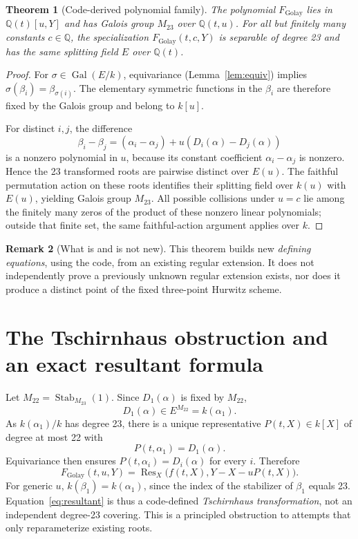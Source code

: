 \documentclass[11pt,letterpaper]{article}
\newtheorem{theorem}{Theorem}[section]
\theoremstyle{definition}
\newtheorem{remark}[theorem]{Remark}
\newcommand{\QQ}{\mathbb{Q}}
\newcommand{\Gal}{\operatorname{Gal}}
\newcommand{\Stab}{\operatorname{Stab}}
\newcommand{\Res}{\operatorname{Res}}
\begin{document}
\begin{theorem}[Code-derived polynomial family]\label{thm:transform}
The polynomial \(F_{\mathrm{Golay}}\) lies in \(\QQ(t)[u,Y]\) and has Galois group \(M_{23}\) over \(\QQ(t,u)\). For all but finitely many constants \(c\in\QQ\), the specialization \(F_{\mathrm{Golay}}(t,c,Y)\) is separable of degree 23 and has the same splitting field \(E\) over \(\QQ(t)\).
\end{theorem}
\begin{proof}
For \(\sigma\in\Gal(E/k)\), equivariance (Lemma~\ref{lem:equiv}) implies \(\sigma(\beta_i)=\beta_{\sigma(i)}\). The elementary symmetric functions in the \(\beta_i\) are therefore fixed by the Galois group and belong to \(k[u]\).

For distinct \(i,j\), the difference
\[
\beta_i-\beta_j=(\alpha_i-\alpha_j)+u(D_i(\alpha)-D_j(\alpha))
\]
is a nonzero polynomial in \(u\), because its constant coefficient \(\alpha_i-\alpha_j\) is nonzero. Hence the 23 transformed roots are pairwise distinct over \(E(u)\). The faithful permutation action on these roots identifies their splitting field over \(k(u)\) with \(E(u)\), yielding Galois group \(M_{23}\). All possible collisions under \(u=c\) lie among the finitely many zeros of the product of these nonzero linear polynomials; outside that finite set, the same faithful-action argument applies over \(k\).
\end{proof}

\begin{remark}[What is and is not new]
This theorem builds new \emph{defining equations}, using the code, from an existing regular extension. It does not independently prove a previously unknown regular extension exists, nor does it produce a distinct point of the fixed three-point Hurwitz scheme.
\end{remark}

\section{The Tschirnhaus obstruction and an exact resultant formula}
Let \(M_{22}=\Stab_{M_{23}}(1)\). Since \(D_1(\alpha)\) is fixed by \(M_{22}\),
\[
D_1(\alpha)\in E^{M_{22}}=k(\alpha_1).
\]
As \(k(\alpha_1)/k\) has degree 23, there is a unique representative \(P(t,X)\in k[X]\) of degree at most 22 with
\[
P(t,\alpha_1)=D_1(\alpha).
\]
Equivariance then ensures \(P(t,\alpha_i)=D_i(\alpha)\) for every \(i\). Therefore
\begin{equation}\label{eq:resultant}
\boxed{F_{\mathrm{Golay}}(t,u,Y)
=\Res_X\bigl(f(t,X),Y-X-uP(t,X)\bigr).}
\end{equation}
For generic \(u\), \(k(\beta_1)=k(\alpha_1)\), since the index of the stabilizer of \(\beta_1\) equals 23. Equation~\eqref{eq:resultant} is thus a code-defined \emph{Tschirnhaus transformation}, not an independent degree-23 covering. This is a principled obstruction to attempts that only reparameterize existing roots.
\end{document}
